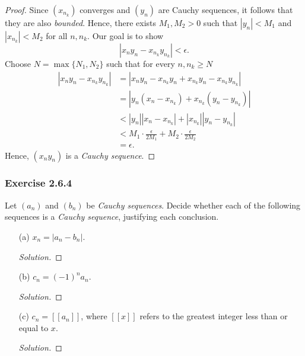 \begin{enumerate}
\begin{proof}
            Since \((x_{n_k})\) converges and \((y_{n})\) are Cauchy sequences, it follows that they are also \textit{bounded}. Hence, there exists \(M_1, M_2 > 0 \) such that \( |y_n| < M_1\) and \( |x_{n_k}| < M_2 \) for all \( n, n_k \). Our goal is to show 
            \[ |x_ny_n - x_{n_k}y_{n_k}| < \epsilon.\]
            Choose \( N = \max \{ N_1, N_2 \}\) such that for every \( n, n_k \geq N \)
            \begin{align*}
                |x_ny_n - x_{n_k}y_{n_k}| &= |x_n y_n - x_{n_k}y_n + x_{n_k}y_n -x_{n_k}y_{n_k} |  \\
                                          &= | y_n (x_n - x_{n_k}) + x_{n_k}(y_n - y_{n_k})| \\
                                          &< |y_n| |x_n - x_{n_k}| + |x_{n_k}| |y_n - y_{n_k}| \\
                                          &< M_1 \cdot \frac{\epsilon}{2 M_1} + M_2 \cdot \frac{\epsilon}{2M_2} \\
                                          &= \epsilon.
            \end{align*}
            Hence, \((x_ny_n)\) is a \textit{Cauchy sequence}.
        \end{proof}
\end{enumerate}

\subsubsection{Exercise 2.6.4} Let \((a_n)\) and \((b_n)\) be \textit{Cauchy sequences}. Decide whether each of the following sequences is a \textit{Cauchy sequence}, justifying each conclusion.
\begin{enumerate}
    \item[(a)] \( x_n = |a_n - b_n|.\)
        \begin{proof}[Solution]
        
        \end{proof}
    \item[(b)] \(c_n = (-1)^n a_n \).
        \begin{proof}[Solution]
        
        \end{proof}
    \item[(c)] \(c_n = [[a_n]]\), where \([[x]]\) refers to the greatest integer less than or equal to \(x\).
        \begin{proof}[Solution]
        
        \end{proof}
\end{enumerate}


